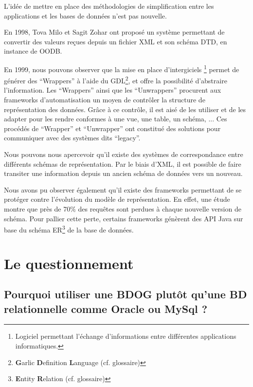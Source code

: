 \documentclass[a4paper,fleqn,12pt,oneside]{book}
\begin{document}
L'idée de mettre en place des méthodologies de simplification entre les applications et les bases de données n'est pas nouvelle. 
\newpage

En 1998, Tova Milo et Sagit Zohar ont proposé un système permettant de convertir des valeurs reçues depuis un fichier XML et son schéma DTD, en instance de OODB\cite{milo1998using}. 

\label{frameworksAnalyse}
En 1999, nous pouvons observer que la mise en place d'intergiciels \footnote{Logiciel permettant l'échange d'informations entre différentes applications informatiques. } permet de générer des \enquote{Wrappers} à l'aide du GDL\footnote{\textbf{G}arlic \textbf{D}efinition \textbf{L}anguage (cf. glossaire)}, et offre la possibilité d'abstraire l'information\cite{niswonger1999transforming}. Les \enquote{Wrappers} ainsi que les \enquote{Unwrappers} procurent aux frameworks d'automatisation un moyen de contrôler la structure de représentation des données. Grâce à ce contrôle, il est aisé de les utiliser et de les adapter pour les rendre conformes à une vue, une table, un schéma, ...  Ces procédés de \enquote{Wrapper} et \enquote{Unwrapper} ont constitué des solutions pour communiquer avec des systèmes dits \enquote{legacy}.

Nous pouvons nous apercevoir qu'il existe des systèmes de correspondance entre différents schémas de représentation. Par le biais d'XML, il est possible de faire transiter une information depuis un ancien schéma de données vers un nouveau\cite{miller2000schema}. 

Nous avons pu observer également qu'il existe des frameworks permettant de se protéger contre l'évolution du modèle de représentation. En effet, une étude montre que près de 70\% des requêtes\cite{curino2008schema} sont perdues à chaque nouvelle version de schéma. Pour pallier cette perte, certains frameworks génèrent des API Java sur base du schéma ER\footnote{\textbf{E}ntity \textbf{R}elation (cf. glossaire)} de la base de données\cite{cleve2010conceptual}.

\section{Le questionnement}

\subsection*{Pourquoi utiliser une BDOG plutôt qu'une BD relationnelle comme Oracle ou MySql ?}
\end{document}

